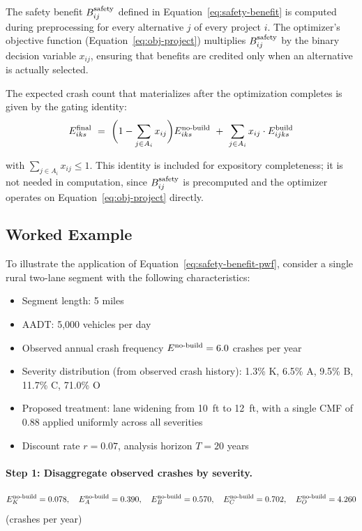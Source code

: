The safety benefit $B^{\mathrm{safety}}_{ij}$ defined in Equation~\ref{eq:safety-benefit}
is computed during preprocessing for every alternative $j$ of every project
$i$. The optimizer's objective function
(Equation~\ref{eq:obj-project}) multiplies $B^{\mathrm{safety}}_{ij}$ by the binary
decision variable $x_{ij}$, ensuring that benefits are credited only when an
alternative is actually selected.

The expected crash count that materializes after the optimization completes
is given by the gating identity:
\begin{equation}
E_{iks}^{\mathrm{final}}\ =\ \biggl(1 - \sum_{j \in A_i} x_{ij}\biggr) E^{\mathrm{no\text{-}build}}_{iks}\ +\ \sum_{j \in A_i} x_{ij} \cdot E^{\mathrm{build}}_{ijks}
\label{eq:gating}
\end{equation}

\noindent with $\sum_{j \in A_i} x_{ij} \leq 1$. This identity is included
for expository completeness; it is not needed in computation, since
$B^{\mathrm{safety}}_{ij}$ is precomputed and the optimizer operates on
Equation~\ref{eq:obj-project} directly.

\subsection{Worked Example}
\label{sec:safety-worked-example}

To illustrate the application of Equation~\ref{eq:safety-benefit-pwf},
consider a single rural two-lane segment with the following characteristics:

\begin{itemize}[leftmargin=2em, itemsep=2pt]
  \item Segment length: 5 miles
  \item AADT: 5{,}000 vehicles per day
  \item Observed annual crash frequency $E^{\mathrm{no\text{-}build}} = 6.0$ crashes per year
  \item Severity distribution (from observed crash history):
    1.3\% K, 6.5\% A, 9.5\% B, 11.7\% C, 71.0\% O
  \item Proposed treatment: lane widening from 10~ft to 12~ft, with a single
    CMF of $0.88$ applied uniformly across all severities
  \item Discount rate $r = 0.07$, analysis horizon $T = 20$ years
\end{itemize}

\paragraph{Step 1: Disaggregate observed crashes by severity.}
\[
E^{\mathrm{no\text{-}build}}_K = 0.078,\quad
E^{\mathrm{no\text{-}build}}_A = 0.390,\quad
E^{\mathrm{no\text{-}build}}_B = 0.570,\quad
E^{\mathrm{no\text{-}build}}_C = 0.702,\quad
E^{\mathrm{no\text{-}build}}_O = 4.260
\]
\quad (crashes per year)

